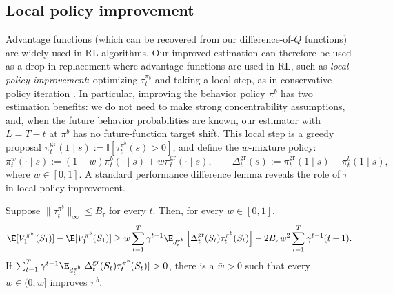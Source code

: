 \documentclass[opre,nonblindrev]{informs4}
\newenvironment{revision}{\begingroup\color{revisionblue}\ignorespaces}{\endgroup}
\newcommand{\norm}[1]{\lVert#1\rVert}
\newcommand{\blipadv}{\tau}
\newcommand{\boundadv}{B_\blipadv}
\begin{document}
\begin{revision}
\subsection{Local policy improvement}\label{sec-behavior-centered-trust-region}

Advantage functions (which can be recovered from our difference-of-$Q$ functions) are widely used in RL algorithms. Our improved estimation can therefore be used as a drop-in replacement where advantage functions are used in RL, such as \textit{local policy improvement}: optimizing $\blipadv^{\pi_b}_t$ and taking a local step, as in conservative policy iteration \citep{kakade2002approximately}. In particular, improving the behavior policy $\pi^b$ has two estimation benefits: we do not need to make strong concentrability assumptions, and, when the future behavior probabilities are known, our estimator with $L=T-t$ at $\pi^b$ has no future-function target shift. This local step is a greedy proposal $\pi_t^{\mathrm{gr}}(1\mid s)
:=\mathbb I[\blipadv_t^{\pi^b}(s)>0]$, and define the $w$-mixture policy:
\begin{equation}
\pi_t^w(\cdot\mid s)
:=(1-w)\pi_t^b(\cdot\mid s)
+w\pi_t^{\mathrm{gr}}(\cdot\mid s),
\qquad
\Delta_t^{\mathrm{gr}}(s)
:=\pi_t^{\mathrm{gr}}(1\mid s)-\pi_t^b(1\mid s),
\label{eqn-behavior-centered-mixture}
\end{equation}
where $w\in[0,1]$. A standard performance difference lemma reveals the role of $\blipadv$ in local policy improvement.


\begin{proposition}
\label{prop-behavior-centered-improvement}
Suppose $\norm{\blipadv_t^{\pi^b}}_\infty\leq\boundadv$ for every $t$.
Then, for every $w\in[0,1]$,
\begin{equation}
\E[V_1^{\pi^w}(S_1)]-\E[V_1^{\pi^b}(S_1)]
\geq w
\sum_{t=1}^T\gamma^{t-1}
\E_{d_t^{\pi^b}}
\left[\Delta_t^{\mathrm{gr}}(S_t)
\blipadv_t^{\pi^b}(S_t)\right]
-2\boundadv w^2
\sum_{t=1}^T\gamma^{t-1}(t-1).
\label{eqn-behavior-centered-improvement}
\end{equation}
If
$\sum_{t=1}^T\gamma^{t-1}\E_{d_t^{\pi^b}}
[\Delta_t^{\mathrm{gr}}(S_t)\blipadv_t^{\pi^b}(S_t)]>0$, there is a
$\bar w>0$ such that every $w\in(0,\bar w]$ improves $\pi^b$.
\end{proposition}


\end{revision}
\end{document}
